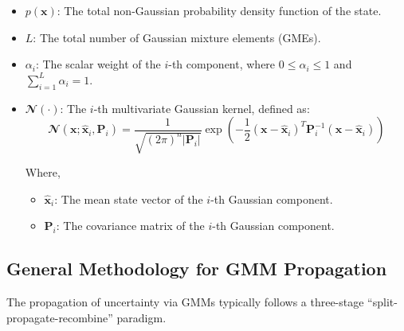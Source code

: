\documentclass[
  letterpaper,
  DIV=11,
  numbers=noendperiod,
  oneside]{scrartcl}
\begin{document}
\begin{itemize}
\item
  \(p(\mathbf{x})\): The total non-Gaussian probability density function
  of the state.
\item
  \(L\): The total number of Gaussian mixture elements (GMEs).
\item
  \(\alpha_i\): The scalar weight of the \(i\)-th component, where
  \(0 \le \alpha_i \le 1\) and \(\sum_{i=1}^{L} \alpha_i = 1\).
\item
  \(\mathbfcal{N}(\cdot)\): The \(i\)-th multivariate Gaussian kernel,
  defined as: \[
  \mathbfcal{N}(\mathbf{x}; \hat{\mathbf{x}}_i, \mathbf{P}_i) = \frac{1}{\sqrt{(2\pi)^n |\mathbf{P}_i|}} \exp \left( -\frac{1}{2} (\mathbf{x} - \hat{\mathbf{x}}_i)^T \mathbf{P}_i^{-1} (\mathbf{x} - \hat{\mathbf{x}}_i) \right)
  \]

  Where,

  \begin{itemize}
  \item
    \(\hat{\mathbf{x}}_i\): The mean state vector of the \(i\)-th
    Gaussian component.
  \item
    \(\mathbf{P}_i\): The covariance matrix of the \(i\)-th Gaussian
    component.
  \end{itemize}
\end{itemize}

\subsection{General Methodology for GMM
Propagation}\label{general-methodology-for-gmm-propagation}

The propagation of uncertainty via GMMs typically follows a three-stage
``split-propagate-recombine'' paradigm.
\end{document}
